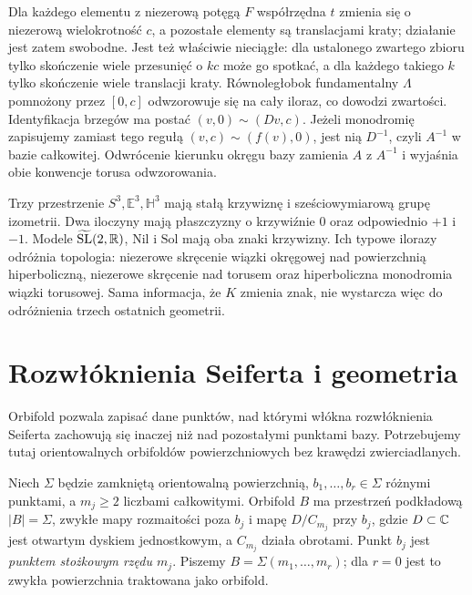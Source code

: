 Dla każdego elementu z niezerową potęgą $F$ współrzędna $t$
zmienia się o niezerową wielokrotność $c$, a pozostałe elementy
są translacjami kraty; działanie jest zatem swobodne.
Jest też właściwie nieciągłe: dla ustalonego zwartego zbioru
tylko skończenie wiele przesunięć o $kc$ może go spotkać,
a dla każdego takiego $k$ tylko skończenie wiele translacji kraty.
Równoległobok fundamentalny $\Lambda$ pomnożony przez $[0,c]$
odwzorowuje się na cały iloraz, co dowodzi zwartości.
Identyfikacja brzegów ma postać $(v,0)\sim(Dv,c)$.
Jeżeli monodromię zapisujemy zamiast tego regułą
$(v,c)\sim(f(v),0)$, jest nią $D^{-1}$, czyli $A^{-1}$
w bazie całkowitej. Odwrócenie kierunku okręgu bazy zamienia
$A$ z $A^{-1}$ i wyjaśnia obie konwencje torusa odwzorowania.

\begin{uwaga}
\label{uw:thurston-eight-comparison}
Trzy przestrzenie $S^3,\mathbb E^3,\mathbb H^3$ mają stałą
krzywiznę i sześciowymiarową grupę izometrii. Dwa iloczyny
mają płaszczyzny o krzywiźnie $0$ oraz odpowiednio $+1$ i $-1$.
Modele $\widetilde{\mathrm{SL}}(2,\mathbb{R})$, $\mathrm{Nil}$
i $\mathrm{Sol}$ mają oba znaki krzywizny. Ich typowe ilorazy
odróżnia topologia: niezerowe skręcenie wiązki okręgowej
nad powierzchnią hiperboliczną, niezerowe skręcenie nad torusem
oraz hiperboliczna monodromia wiązki torusowej.
Sama informacja, że $K$ zmienia znak, nie wystarcza więc
do odróżnienia trzech ostatnich geometrii.
\end{uwaga}

\section{Rozwłóknienia Seiferta i geometria}
\label{sec:thurston-seifert}

Orbifold pozwala zapisać dane punktów, nad którymi włókna
rozwłóknienia Seiferta zachowują się inaczej niż nad pozostałymi
punktami bazy. Potrzebujemy tutaj orientowalnych orbifoldów
powierzchniowych bez krawędzi zwierciadlanych.

\begin{definicja}
\label{def:thurston-orbifold-bazy}
Niech $\Sigma$ będzie zamkniętą orientowalną powierzchnią,
$b_1,\ldots,b_r\in\Sigma$ różnymi punktami, a $m_j\geq2$
liczbami całkowitymi. Orbifold $B$ ma przestrzeń podkładową
$|B|=\Sigma$, zwykłe mapy rozmaitości poza $b_j$ i mapę
$D/C_{m_j}$ przy $b_j$, gdzie $D\subset\mathbb{C}$ jest otwartym
dyskiem jednostkowym, a $C_{m_j}$ działa obrotami.
Punkt $b_j$ jest \emph{punktem stożkowym rzędu $m_j$}.
Piszemy $B=\Sigma(m_1,\ldots,m_r)$; dla $r=0$ jest to
zwykła powierzchnia traktowana jako orbifold.
\end{definicja}

